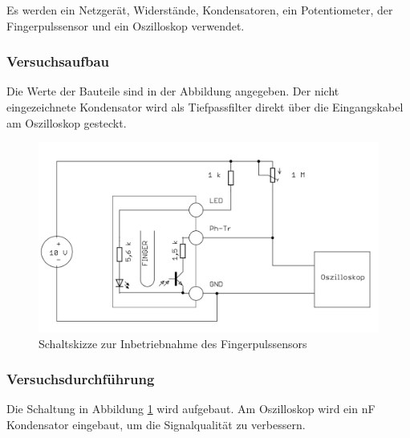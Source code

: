 \documentclass[12pt,a4paper]{article}
\begin{document}
Es werden ein Netzgerät, Widerstände, Kondensatoren, ein Potentiometer, der Fingerpulssensor und ein Oszilloskop verwendet.

\subsubsection*{Versuchsaufbau}

Die Werte der Bauteile sind in der Abbildung angegeben. Der nicht eingezeichnete Kondensator wird als Tiefpassfilter direkt über die Eingangskabel am Oszilloskop gesteckt.

\begin{figure}[H] 
	\centering
	\includegraphics[scale = 0.3]{auf_1.png}
	\caption[Schaltskizze zur Inbetriebnahme des Fingerpulssensors]{Schaltskizze zur Inbetriebnahme des Fingerpulssensors\footnotemark}
	\label{fig:auf_1}
\end{figure}

\subsubsection*{Versuchsdurchführung}

Die Schaltung in Abbildung \ref{fig:auf_1} wird aufgebaut. Am Oszilloskop wird ein \unit[100]{nF} Kondensator eingebaut, um die Signalqualität zu verbessern.
\end{document}
